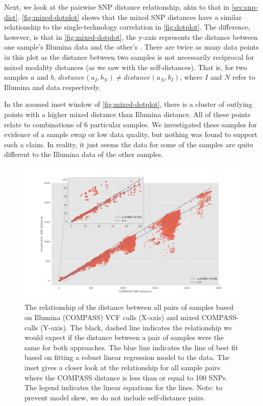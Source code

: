 \noindent
Next, we look at the pairwise SNP distance relationship, akin to that in \autoref{sec:snp-dist}. \autoref{fig:mixed-dotplot} shows that the mixed SNP distances have a similar relationship to the single-technology correlation in \autoref{fig:dotplot}. The difference, however, is that in \autoref{fig:mixed-dotplot}, the y-axis represents the distance between one sample's Illumina data and the other's \ont{}. There are twice as many data points in this plot as the distance between two samples is not necessarily reciprocal for mixed modality distances (as we saw with the self-distances). That is, for two samples $a$ and $b$, $distance(a_I,b_N) \neq distance(a_N, b_I)$, where $I$ and $N$ refer to Illumina and \ont{} data respectively. 

In the zoomed inset window of \autoref{fig:mixed-dotplot}, there is a cluster of outlying points with a higher mixed distance than Illumina distance. All of these points relate to combinations of 6 particular samples. We investigated these samples for evidence of a sample swap or low data quality, but nothing was found to support such a claim. In reality, it just seems the \ont{} data for some of the samples are quite different to the Illumina data of the other samples.

\begin{figure}
\begin{center}
\includegraphics[width=0.90\columnwidth]{Chapter2/Figs/mixed-dotplot.png}
\caption{{The relationship of the distance between all pairs of samples based on Illumina (COMPASS) VCF calls (X-axis) and mixed COMPASS-\bcftools{} calls (Y-axis). The black, dashed line indicates the relationship we would expect if the distance between a pair of samples were the same for both approaches. The blue line indicates the line of best fit based on fitting a robust linear regression model to the data. The inset gives a closer look at the relationship for all sample pairs where the COMPASS distance is less than or equal to 100 SNPs. The legend indicates the linear equations for the lines. Note: to prevent model skew, we do not include self-distance pairs.
{\label{fig:mixed-dotplot}}
}}
\end{center}
\end{figure}

